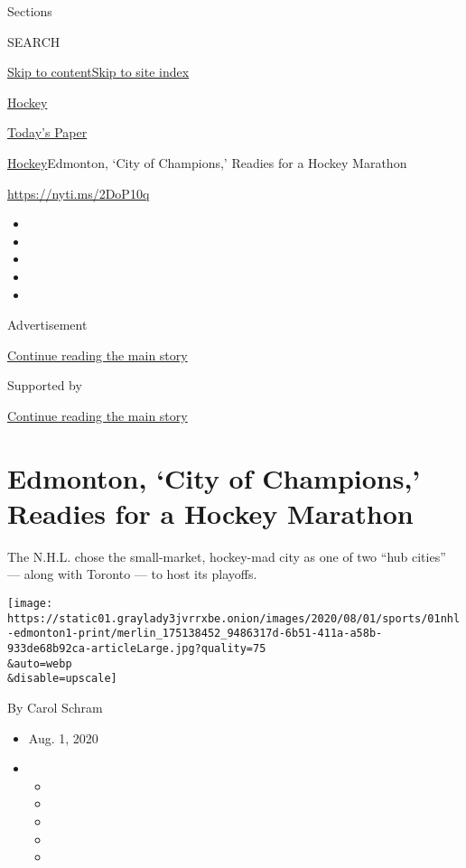 Sections

SEARCH

\protect\hyperlink{site-content}{Skip to
content}\protect\hyperlink{site-index}{Skip to site index}

\href{https://www.nytimes3xbfgragh.onion/section/sports/hockey}{Hockey}

\href{https://myaccount.nytimes3xbfgragh.onion/auth/login?response_type=cookie\&client_id=vi}{}

\href{https://www.nytimes3xbfgragh.onion/section/todayspaper}{Today's
Paper}

\href{/section/sports/hockey}{Hockey}\textbar{}Edmonton, `City of
Champions,' Readies for a Hockey Marathon

\url{https://nyti.ms/2DoP10q}

\begin{itemize}
\item
\item
\item
\item
\item
\end{itemize}

Advertisement

\protect\hyperlink{after-top}{Continue reading the main story}

Supported by

\protect\hyperlink{after-sponsor}{Continue reading the main story}

\hypertarget{edmonton-city-of-champions-readies-for-a-hockey-marathon}{%
\section{Edmonton, `City of Champions,' Readies for a Hockey
Marathon}\label{edmonton-city-of-champions-readies-for-a-hockey-marathon}}

The N.H.L. chose the small-market, hockey-mad city as one of two ``hub
cities'' --- along with Toronto --- to host its playoffs.

\texttt{[image: https://static01.graylady3jvrrxbe.onion/images/2020/08/01/sports/01nhl-edmonton1-print/merlin\_175138452\_9486317d-6b51-411a-a58b-933de68b92ca-articleLarge.jpg?quality=75\\\&auto=webp\\\&disable=upscale]}

By Carol Schram

\begin{itemize}
\item
  Aug. 1, 2020
\item
  \begin{itemize}
  \item
  \item
  \item
  \item
  \item
  \end{itemize}
\end{itemize}

